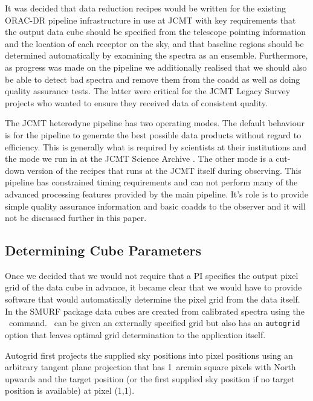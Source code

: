 \documentclass[final,authoryear,5p,times,twocolumn]{elsarticle}
\begin{document}
It was decided that data reduction recipes would be written for the
existing ORAC-DR pipeline infrastructure in use at JCMT
\citep{TFAJenness2011,2008AN....329..295C} with key requirements that
the output data cube should be specified from the telescope pointing
information and the location of each receptor on the sky, and that
baseline regions should be determined automatically by examining the
spectra as an ensemble. Furthermore, as progress was made on the
pipeline we additionally realised that we should also be able to
detect bad spectra and remove them from the coadd as well as doing
quality assurance tests. The latter were critical for the JCMT Legacy
Survey projects
\citep{2007PASP..119..855W,2009ApJ...693.1736W,2007PASP..119..102P}
who wanted to ensure they received data of consistent quality.

The JCMT heterodyne pipeline has two operating modes. The default behaviour is
for the pipeline to generate the best possible data products without
regard to efficiency. This is generally what is required by scientists
at their institutions and the mode we run in at the JCMT Science
Archive \citep{2008ASPC..394..565J}. The other mode is a cut-down
version of the recipes that runs at the JCMT itself during
observing. This pipeline has constrained timing requirements and can
not perform many of the advanced processing features provided by the
main pipeline. It's role is to provide simple quality assurance
information and basic coadds to the observer and it will not be
discussed further in this paper.

\subsection{Determining Cube Parameters}
\label{sec:makecube}

Once we decided that we would not require that a PI specifies the
output pixel grid of the data cube in advance, it became clear that we
would have to provide software that would automatically determine the
pixel grid from the data itself. In the SMURF package data cubes are
created from calibrated spectra using the \makecube\
command. \makecube\ can be given an externally specified grid but also
has an \texttt{autogrid} option that leaves optimal grid determination
to the application itself.

Autogrid first projects the supplied sky positions into pixel
positions using an arbitrary tangent plane projection that has
1~arcmin square pixels with North upwards and the target position
(or the first supplied sky position if no target position is
available) at pixel (1,1).
\end{document}
